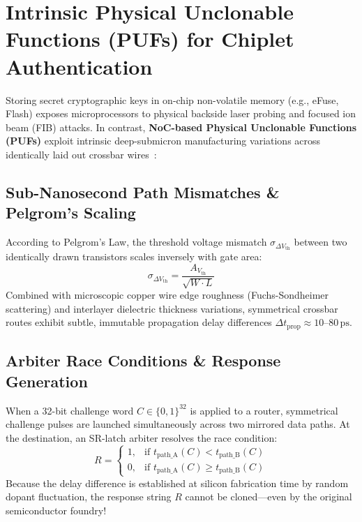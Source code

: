 \section{Intrinsic Physical Unclonable Functions (PUFs) for Chiplet Authentication}
\label{sec:noc-puf}

Storing secret cryptographic keys in on-chip non-volatile memory (e.g., eFuse, Flash) exposes microprocessors to physical backside laser probing and focused ion beam (FIB) attacks. In contrast, \textbf{NoC-based Physical Unclonable Functions (PUFs)} exploit intrinsic deep-submicron manufacturing variations across identically laid out crossbar wires~\cite{Grover2025PUF}:

\subsection{Sub-Nanosecond Path Mismatches \& Pelgrom's Scaling}
According to Pelgrom's Law, the threshold voltage mismatch $\sigma_{\Delta V_{\mathrm{th}}}$ between two identically drawn transistors scales inversely with gate area:
\begin{equation}
\sigma_{\Delta V_{\mathrm{th}}} = \frac{A_{V_{\mathrm{th}}}}{\sqrt{W \cdot L}}
\label{eq:pelgrom}
\end{equation}
Combined with microscopic copper wire edge roughness (Fuchs-Sondheimer scattering) and interlayer dielectric thickness variations, symmetrical crossbar routes exhibit subtle, immutable propagation delay differences $\Delta t_{\mathrm{prop}} \approx 10\text{--}80\,\mathrm{ps}$.

\subsection{Arbiter Race Conditions \& Response Generation}
When a 32-bit challenge word $C \in \{0, 1\}^{32}$ is applied to a router, symmetrical challenge pulses are launched simultaneously across two mirrored data paths. At the destination, an SR-latch arbiter resolves the race condition:
\begin{equation}
R = \begin{cases} 
1, & \text{if } t_{\mathrm{path\_A}}(C) < t_{\mathrm{path\_B}}(C) \\
0, & \text{if } t_{\mathrm{path\_A}}(C) \ge t_{\mathrm{path\_B}}(C)
\end{cases}
\end{equation}
Because the delay difference is established at silicon fabrication time by random dopant fluctuation, the response string $R$ cannot be cloned—even by the original semiconductor foundry!

